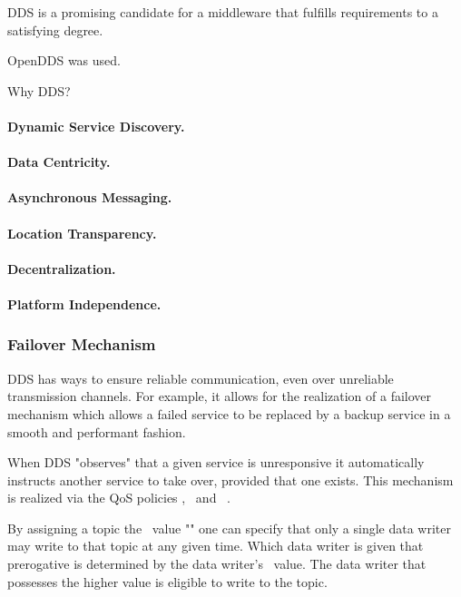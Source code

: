 DDS is a promising candidate for a middleware that fulfills requirements to a satisfying degree.

OpenDDS was used.

Why DDS?

\paragraph{Dynamic Service Discovery.}

\paragraph{Data Centricity.}

\paragraph{Asynchronous Messaging.}

\paragraph{Location Transparency.}

\paragraph{Decentralization.}

\paragraph{Platform Independence.}


\subsubsection{Failover Mechanism}

DDS has ways to ensure reliable communication, even over unreliable transmission channels. For example, it allows for the realization of a failover mechanism which allows a failed service to be replaced by a backup service in a smooth and performant fashion. 

When DDS "observes" that a given service is unresponsive it automatically instructs another service to take over, provided that one exists. This mechanism is realized via the QoS policies \ownership , \ostrength\ and \liveliness\ . 

By assigning a topic the \ownership\ value "" one can specify that only a single data writer may write to that topic at any given time. Which data writer is given that prerogative is determined by the data writer's \ostrength\ value. The data writer that possesses the higher value is eligible to write to the topic.

